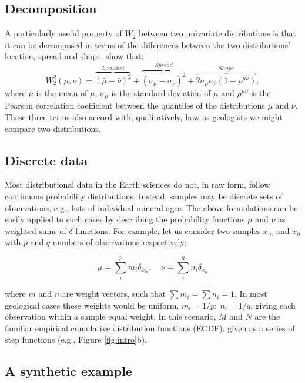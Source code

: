 \documentclass[gchron, manuscript]{copernicus}
\begin{document}
\subsection{Decomposition}

A particularly useful property of $W_2$ between two univariate distributions is that it can be decomposed in terms of the differences between the two distributions' location, spread and shape. \cite{irpino_optimal_2007} show that: 
\begin{equation}
    W^2_2(\mu,\nu) = \overbrace{(\bar{\mu} - \bar{\nu})^2}^{Location} + \overbrace{(\sigma_{\mu} - \sigma_{\nu})^2}^{Spread} + \overbrace{2\sigma_{\mu}\sigma_{\nu}(1-\rho^{\mu \nu})}^{Shape},
    \label{eq:decomposition}
\end{equation}
where $\bar{\mu}$ is the mean of $\mu$, $\sigma_{\mu}$ is the standard deviation of $\mu$ and $\rho^{\mu\nu}$ is the Pearson correlation coefficient between the quantiles of the distributions $\mu$ and $\nu$. These three terms also accord with, qualitatively, how as geologists we might compare two distributions. 

\subsection{Discrete data}

Most distributional data in the Earth sciences do not, in raw form, follow continuous probability distributions. Instead, samples may be discrete sets of observations, e.g., lists of individual mineral ages. The above formulations can be easily applied to such cases by describing the probability functions $\mu$ and $\nu$ as weighted sums of $\delta$ functions. For example, let us consider two samples $x_m$ and $x_n$ with $p$ and $q$ numbers of observations respectively: 

\begin{equation}
        \mu = \sum^p_i m_i \delta_{x_m}, \quad
        \nu = \sum^q_i n_i \delta_{x_n}
\end{equation}

where $m$ and $n$ are weight vectors, such that $\sum m_i = \sum n_i = 1$. In most geological cases these weights would be uniform, $m_i = 1/p;~ n_i = 1/q$, giving each observation within a sample equal weight. 
In this scenario, $M$ and $N$ are the familiar empirical cumulative distribution functions (ECDF), given as a series of step functions (e.g., Figure \ref{fig:intro}b). 

\subsection{A synthetic example}
\end{document}
